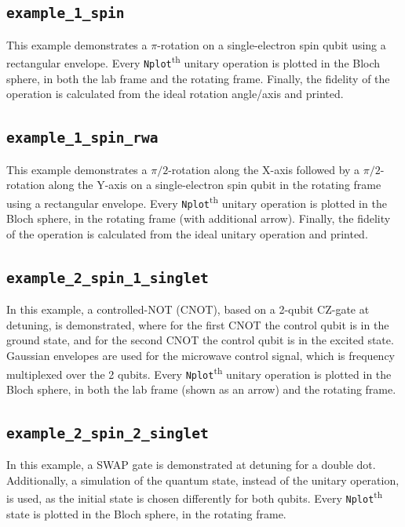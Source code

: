 \documentclass[10pt,a4paper,onecolumn,notitlepage]{article}
\begin{document}
\subsection{\lstinline{example_1_spin}}
This example demonstrates a $\pi$-rotation on a single-electron spin qubit using a rectangular envelope. Every \lstinline{Nplot}\textsuperscript{th} unitary operation is plotted in the Bloch sphere, in both the lab frame and the rotating frame. Finally, the fidelity of the operation is calculated from the ideal rotation angle/axis and printed.

\subsection{\lstinline{example_1_spin_rwa}}
This example demonstrates a $\pi/2$-rotation along the X-axis followed by a $\pi/2$-rotation along the Y-axis on a single-electron spin qubit in the rotating frame using a rectangular envelope. Every \lstinline{Nplot}\textsuperscript{th} unitary operation is plotted in the Bloch sphere, in the rotating frame (with additional arrow). Finally, the fidelity of the operation is calculated from the ideal unitary operation and printed.

\subsection{\lstinline{example_2_spin_1_singlet}}
In this example, a controlled-NOT (CNOT), based on a 2-qubit CZ-gate at detuning, is demonstrated, where for the first CNOT the control qubit is in the ground state, and for the second CNOT the control qubit is in the excited state. Gaussian envelopes are used for the microwave control signal, which is frequency multiplexed over the 2 qubits. Every \lstinline{Nplot}\textsuperscript{th} unitary operation is plotted in the Bloch sphere, in both the lab frame (shown as an arrow) and the rotating frame.

\subsection{\lstinline{example_2_spin_2_singlet}}
In this example, a SWAP gate is demonstrated at detuning for a double dot. Additionally, a simulation of the quantum state, instead of the unitary operation, is used, as the initial state is chosen differently for both qubits. Every \lstinline{Nplot}\textsuperscript{th} state is plotted in the Bloch sphere, in the rotating frame.
\end{document}
